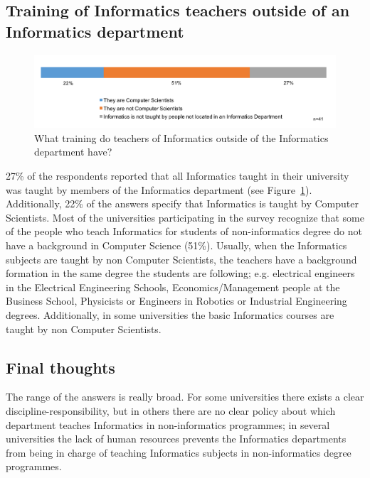 \subsection{Training of Informatics teachers outside of an Informatics department}

\begin{figure}[h]
\includegraphics[width = \linewidth]{charts/2d.png}
\caption{What training do teachers of Informatics outside of the Informatics department have?}
\label{sect3:whoteaches}
\end{figure}
27\% of the respondents reported that all Informatics taught in their university was taught by members of the Informatics department (see Figure~\ref{sect3:whoteaches}).
Additionally, 22\% of the answers specify that Informatics is taught by Computer Scientists. 
Most of the universities participating in the survey recognize that some of the people who teach Informatics for students of non-informatics degree do not have a background in Computer Science (51\%). Usually, when the Informatics subjects are  taught by non Computer Scientists, the teachers have a background formation in the same degree the students are following; e.g. electrical engineers in the Electrical Engineering Schools, Economics/Management people at the Business School, Physicists or Engineers in Robotics or Industrial Engineering degrees. Additionally, in some universities the basic Informatics courses  are taught by non Computer Scientists.   


\subsection{Final thoughts}

The range of the answers is really broad. For some universities there exists a clear discipline-responsibility, but in others there are no clear policy about which department teaches Informatics in non-informatics programmes; in several universities the lack of human resources prevents the Informatics departments from being in charge of teaching Informatics subjects in non-informatics degree programmes.
